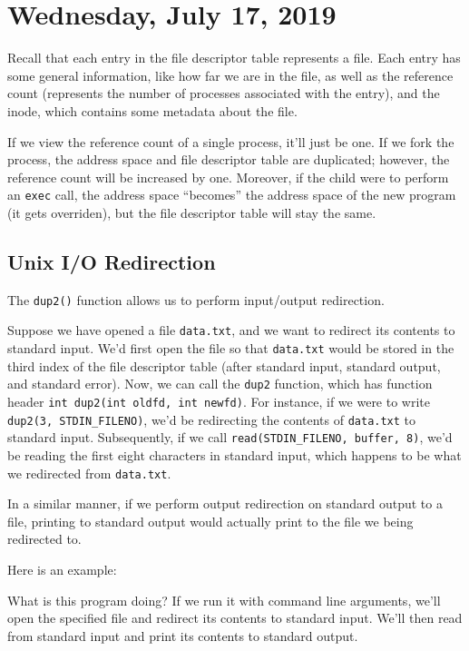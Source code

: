 \section{Wednesday, July 17, 2019}
Recall that each entry in the file descriptor table represents a file. Each entry has some general information, like how far we are in the file, as well as the reference count (represents the number of processes associated with the entry), and the inode, which contains some metadata about the file.

If we view the reference count of a single process, it'll just be one. If we fork the process, the address space and file descriptor table are duplicated; however, the reference count will be increased by one. Moreover, if the child were to perform an \verb!exec! call, the address space ``becomes'' the address space of the new program (it gets overriden), but the file descriptor table will stay the same.


\subsection{Unix I/O Redirection}
The \verb!dup2()! function allows us to perform input/output redirection. 

Suppose we have opened a file \verb!data.txt!, and we want to redirect its contents to standard input. We'd first open the file so that \verb!data.txt! would be stored in the third index of the file descriptor table (after standard input, standard output, and standard error). Now, we can call the \verb!dup2! function, which has function header \verb!int dup2(int oldfd, int newfd)!. For instance, if we were to write \verb!dup2(3, STDIN_FILENO)!, we'd be redirecting the contents of \verb!data.txt! to standard input. Subsequently, if we call \verb!read(STDIN_FILENO, buffer, 8)!, we'd be reading the first eight characters in standard input, which happens to be what we redirected from \verb!data.txt!. 


In a similar manner, if we perform output redirection on standard output to a file, printing to standard output would actually print to the file we being redirected to.

Here is an example:


\lstset{caption=Dup2 Example 1}
\begin{center}

\end{center}

What is this program doing? If we run it with command line arguments, we'll open the specified file and redirect its contents to standard input. We'll then read from standard input and print its contents to standard output.

